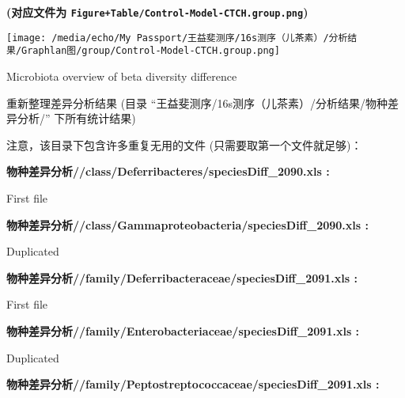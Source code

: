 \documentclass[
]{article}
\begin{document}
\textbf{(对应文件为 \texttt{Figure+Table/Control-Model-CTCH.group.png})}

\def\@captype{figure}
\begin{center}
\texttt{[image: /media/echo/My Passport/王益斐测序/16s测序（儿茶素）/分析结果/Graphlan图/group/Control-Model-CTCH.group.png]}
\caption{Microbiota overview of beta diversity difference}\label{fig:microbiota-overview-of-beta-diversity-difference}
\end{center}

重新整理差异分析结果 (目录 ``王益斐测序/16s测序（儿茶素）/分析结果/物种差异分析/'' 下所有统计结果)

注意，该目录下包含许多重复无用的文件 (只需要取第一个文件就足够)：

\begin{center}\begin{tcolorbox}[colback=gray!10, colframe=gray!50, width=0.9\linewidth, arc=1mm, boxrule=0.5pt]
\textbf{
物种差异分析//class/Deferribacteres/speciesDiff\_2090.xls
:}

\vspace{0.5em}

    First file

\vspace{2em}


\textbf{
物种差异分析//class/Gammaproteobacteria/speciesDiff\_2090.xls
:}

\vspace{0.5em}

    Duplicated

\vspace{2em}


\textbf{
物种差异分析//family/Deferribacteraceae/speciesDiff\_2091.xls
:}

\vspace{0.5em}

    First file

\vspace{2em}


\textbf{
物种差异分析//family/Enterobacteriaceae/speciesDiff\_2091.xls
:}

\vspace{0.5em}

    Duplicated

\vspace{2em}


\textbf{
物种差异分析//family/Peptostreptococcaceae/speciesDiff\_2091.xls
:}

\vspace{0.5em}


\end{tcolorbox}
\end{center}
\end{document}
